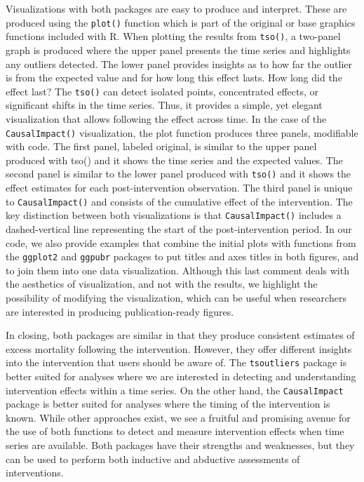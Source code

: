 \documentclass[12pt]{article}
\begin{document}
Visualizations with both packages are easy to produce and interpret.
These are produced using the \texttt{plot()} function which is part of
the original or base graphics functions included with R. When plotting
the results from \texttt{tso()}, a two-panel graph is produced where the
upper panel presents the time series and highlights any outliers
detected. The lower panel provides insights as to how far the outlier is
from the expected value and for how long this effect lasts. How long did
the effect last? The \texttt{tso()} can detect isolated points,
concentrated effects, or significant shifts in the time series. Thus, it
provides a simple, yet elegant visualization that allows following the
effect across time. In the case of the \texttt{CausalImpact()}
visualization, the plot function produces three panels, modifiable with
code. The first panel, labeled original, is similar to the upper panel
produced with tso() and it shows the time series and the expected
values. The second panel is similar to the lower panel produced with
\texttt{tso()} and it shows the effect estimates for each
post-intervention observation. The third panel is unique to
\texttt{CausalImpact()} and consists of the cumulative effect of the
intervention. The key distinction between both visualizations is that
\texttt{CausalImpact()} includes a dashed-vertical line representing the
start of the post-intervention period. In our code, we also provide
examples that combine the initial plots with functions from the
\texttt{ggplot2} and \texttt{ggpubr} packages to put titles and axes
titles in both figures, and to join them into one data visualization.
Although this last comment deals with the aesthetics of visualization,
and not with the results, we highlight the possibility of modifying the
visualization, which can be useful when researchers are interested in
producing publication-ready figures.

In closing, both packages are similar in that they produce consistent
estimates of excess mortality following the intervention. However, they
offer different insights into the intervention that users should be
aware of. The \texttt{tsoutliers} package is better suited for analyses
where we are interested in detecting and understanding intervention
effects within a time series. On the other hand, the
\texttt{CausalImpact} package is better suited for analyses where the
timing of the intervention is known. While other approaches exist, we
see a fruitful and promising avenue for the use of both functions to
detect and measure intervention effects when time series are available.
Both packages have their strengths and weaknesses, but they can be used
to perform both inductive and abductive assessments of interventions.



\end{document}
